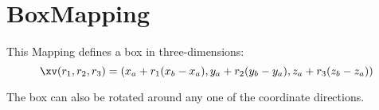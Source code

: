 \section{BoxMapping}

This Mapping defines a box in three-dimensions:
\[
  \xv(r_1,r_2,r_3) = ( x_a + r_1(x_b-x_a) , y_a + r_2(y_b-y_a), z_a + r_3(z_b-z_a) )
\]

The box can also be rotated around any one of the coordinate directions.

